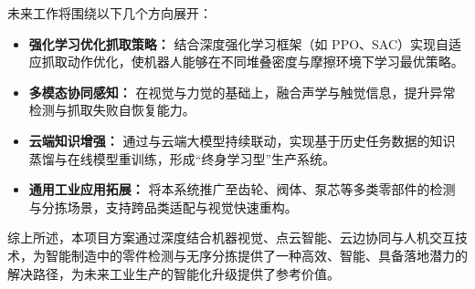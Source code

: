 \documentclass{cumcmthesis}
\begin{document}
未来工作将围绕以下几个方向展开：

\begin{itemize}
    \item \textbf{强化学习优化抓取策略：} 结合深度强化学习框架（如 PPO、SAC）实现自适应抓取动作优化，使机器人能够在不同堆叠密度与摩擦环境下学习最优策略。
    \item \textbf{多模态协同感知：} 在视觉与力觉的基础上，融合声学与触觉信息，提升异常检测与抓取失败自恢复能力。
    \item \textbf{云端知识增强：} 通过与云端大模型持续联动，实现基于历史任务数据的知识蒸馏与在线模型重训练，形成“终身学习型”生产系统。
    \item \textbf{通用工业应用拓展：} 将本系统推广至齿轮、阀体、泵芯等多类零部件的检测与分拣场景，支持跨品类适配与视觉快速重构。
\end{itemize}

综上所述，本项目方案通过深度结合机器视觉、点云智能、云边协同与人机交互技术，为智能制造中的零件检测与无序分拣提供了一种高效、智能、具备落地潜力的解决路径，为未来工业生产的智能化升级提供了参考价值。
\newpage

\end{document}
